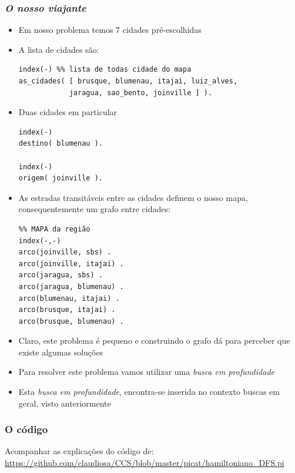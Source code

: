 \begin{frame}[fragile, allowframebreaks=0.9]
 \frametitle{\textit{O nosso viajante}}

\begin{itemize}
  \item Em nosso problema temos 7 cidades pré-escolhidas

  \item A lista de cidades são:
  \begin{verbatim}
index(-) %% lista de todas cidade do mapa
as_cidades( [ brusque, blumenau, itajai, luiz_alves,
            jaragua, sao_bento, joinville ] ).
\end{verbatim}

  \item  Duas cidades em particular
\begin{verbatim}
index(-)
destino( blumenau ).

index(-)
origem( joinville ).
\end{verbatim}  

  
\item As estradas transitáveis entre as cidades definem
  o nosso mapa, consequentemente um grafo entre
  cidades:
\begin{verbatim}
%% MAPA da região
index(-,-)
arco(joinville, sbs) .
arco(joinville, itajai) .
arco(jaragua, sbs) .
arco(jaragua, blumenau) .
arco(blumenau, itajai) .
arco(brusque, itajai) .
arco(brusque, blumenau) .
\end{verbatim} 
  
\item Claro, este problema é pequeno e construindo o grafo dá para perceber que existe
algumas soluções

  \item Para resolver este problema vamos utilizar uma \textit{busca em profundidade}
  
  \item Esta \textit{busca em profundidade}, encontra-se inserida no contexto buscas em geral,
  visto anteriormente
\end{itemize}


\end{frame}


\begin{frame}[fragile]
 \frametitle{O código}

Acompanhar as explicações do código de:\\
\url{https://github.com/claudiosa/CCS/blob/master/picat/hamiltoniano_DFS.pi}

\end{frame}













